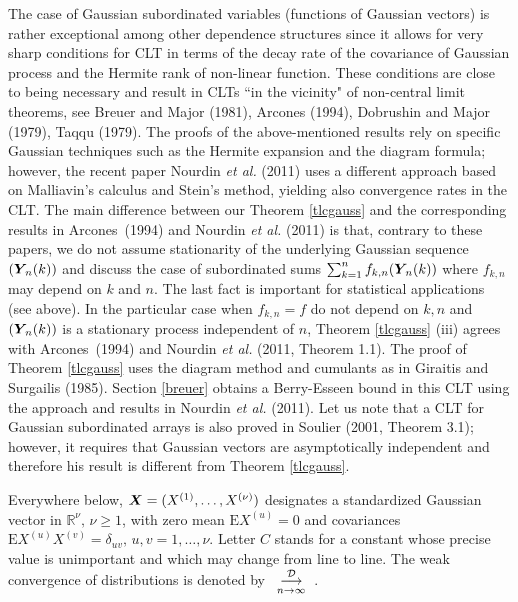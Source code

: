 \documentclass[10pt]{article}
\def\R{\mathbb{R}}
\def\E{\mathrm E}
\newcommand{\mbf}[1]{\mbox{\boldmath $#1$}}
\def\limiteloin{\renewcommand{\arraystretch}{0.5}
\begin{array}[t]{c}
\stackrel{{\cal D}}{\longrightarrow} \\
{\scriptstyle n \rightarrow\infty}
\end{array}\renewcommand{\arraystretch}{1}}
\begin{document}
The case of Gaussian subordinated variables (functions of Gaussian vectors)
is rather exceptional among other dependence structures  since it allows for
very sharp conditions for CLT in terms of the decay rate of the covariance of Gaussian process and the Hermite rank of non-linear function. 
These conditions 
are close to being necessary and result in CLTs  ``in the vicinity" of non-central limit theorems, see Breuer and Major (1981), Arcones (1994),  
Dobrushin and Major (1979), Taqqu (1979).
The proofs of the above-mentioned results rely on
specific Gaussian techniques such as the Hermite expansion and the diagram formula; however, the recent paper
Nourdin {\it et al.} (2011) uses a different approach based on Malliavin's calculus and Stein's method, yielding also 
convergence rates in the CLT. The main 
difference between our Theorem \ref{tlcgauss} and the corresponding results in Arcones~(1994) and Nourdin {\it et al.} (2011) is that, contrary to these papers,
we do not assume stationarity of the underlying
Gaussian sequence  $\left({\mbf
Y}_{\! n}(k) \right)$ and discuss the case of subordinated sums $\sum_{k=1}^n f_{k,n}({\mbf Y}_{\! n}(k))$ where
$f_{k,n}$ may depend on $k$ and $n$. The last fact is important for statistical applications (see above). In the particular
case when $f_{k,n} = f$ do not depend on $k, n$ and $({\mbf Y}_{\! n}(k))$ is a stationary process independent of $n$,
Theorem \ref{tlcgauss} (iii) agrees with Arcones~(1994) and Nourdin {\it et al.} (2011, Theorem 1.1). The proof of Theorem \ref{tlcgauss}
uses the diagram method and cumulants as in Giraitis and Surgailis (1985).  Section  \ref{breuer} obtains
a Berry-Esseen bound in this CLT using the approach and results in Nourdin {\it et al.} (2011). Let us note that a CLT 
for Gaussian subordinated arrays is also proved in Soulier (2001, Theorem 3.1); however, it requires
that Gaussian vectors are asymptotically independent and therefore his result is different from Theorem \ref{tlcgauss}. ~\\


\smallskip

 Everywhere below, ${\mbf X} = (X^{(1)}, \dots, X^{(\nu)})$ designates a
standardized Gaussian vector in $\R^\nu,  \, \nu \ge 1$, with zero mean $\E X^{(u)}  =0 $
and covariances $\E X^{(u)} X^{(v)} = \delta_{uv}, \,  u,v = 1,
\dots, \nu$. Letter $C$ stands for a constant whose precise value is unimportant and which may change from line
to line. The weak convergence of distributions is denoted by $\limiteloin $.
\end{document}
